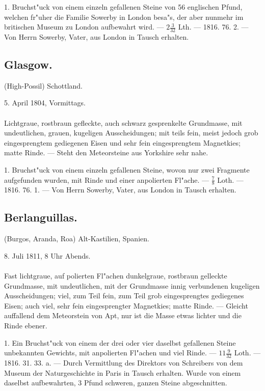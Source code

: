 \documentclass[a4paper, 11pt, oneside, polutonikogreek, german]{article}
\begin{document}
1. Bruchst"uck von einem einzeln gefallenen Steine von 56 englischen Pfund, welchen fr"uher die Familie Sowerby in London besa"s, der aber nunmehr im britischen Museum zu London aufbewahrt wird. --- $2\frac{3}{32}$ Lth. --- 1816. 76. 2. --- Von Herrn Sowerby, Vater, aus London in Tausch erhalten.
\subsection{Glasgow.}
\begin{center}
\small
(High-Possil) Schottland.

5. April 1804, Vormittags.
\end{center}
\paragraph{}
Lichtgraue, rostbraun gefleckte, auch schwarz gesprenkelte Grundmasse, mit undeutlichen, grauen, kugeligen Ausscheidungen; mit teils fein, meist jedoch grob eingesprengtem gediegenen Eisen und sehr fein eingesprengtem Magnetkies; matte Rinde. --- Steht den Meteorsteine aus Yorkshire sehr nahe.

1. Bruchst"uck von einem einzeln gefallenen Steine, wovon nur zwei Fragmente aufgefunden wurden, mit Rinde und einer anpolierten Fl"ache. --- $\frac{7}{8}$ Loth. --- 1816. 76. 1. --- Von Herrn Sowerby, Vater, aus London in Tausch erhalten.
\subsection{Berlanguillas.}
\begin{center}
\small
(Burgos, Aranda, Roa) Alt-Kastilien, Spanien.

8. Juli 1811, 8 Uhr Abends.
\end{center}
\paragraph{}
Fast lichtgraue, auf polierten Fl"achen dunkelgraue, rostbraun gelleckte Grundmasse, mit undeutlichen, mit der Grundmasse innig verbundenen kugeligen Ausscheidungen; viel, zum Teil fein, zum Teil grob eingesprengtes gediegenes Eisen; auch viel, sehr fein eingesprengter Magnetkies; matte Rinde. --- Gleicht auffallend dem Meteorstein von Apt, nur ist die Masse etwas lichter und die Rinde ebener.

1. Ein Bruchst"uck von einem der drei oder vier daselbst gefallenen Steine unbekannten Gewichts, mit anpolierten Fl"achen und viel Rinde. --- $11\frac{9}{32}$ Loth. --- 1816. 31. 33. a. --- Durch Vermittlung des Direktors von Schreibers von dem Museum der Naturgeschichte in Paris in Tausch erhalten. Wurde von einem daselbst aufbewahrten, 3 Pfund schweren, ganzen Steine abgeschnitten.
\end{document}
